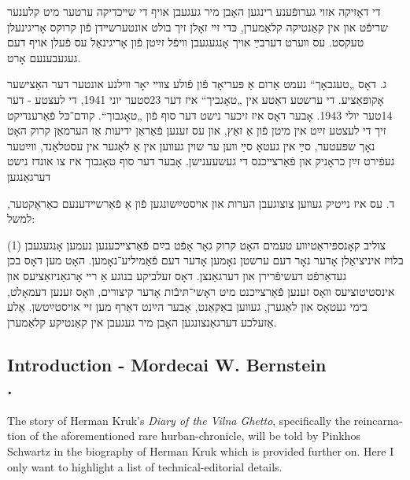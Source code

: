 \documentclass{article}
\begin{document}
\begin{pairs}
\begin{Rightside}
\begin{RTL}
\begin{hebrew}
די דאָזיקה אזוי גערופֿענע רינגען האָבן מיר געגעבן אויף די שײכדיקה ערטער מיט קלענער
שריפֿט און אין קאַנטיקה קלאַמערן, כּדי זײ זאָלן זיך בולט
אונטערשײדן פֿון קרוקס אָריגינעלן טעקסט. עס װערט דערבײַ אויך אָנגעגעבן
װיפֿל זײַטן פֿון אָריגינאַל עס פֿעלן אויף דעם געגעבענעם אָרט.

ג. דאָס „טעגבאָך“ נעמט אַרום אַ פּעריאָד פֿון פֿולע צװײ יאָר װילנע אונטער
דער האַצישער אָקופּאַציע. די ערשטע דאַטע אין „טאָגביך“ איז דער 23סטער יוני
1941, די לעצטע - דער 14טער יולי 1943. אָבער דאָס איז זיכער נישט דער
סוף פֿון „טאָגבוך“. קודם־כּל פֿאַרענדיקט זיך די לעצטע זײַט אין מיטן פֿון אַ זאַץ,
און עס זענען פֿאַראַן ידיעות אַז הערמאַן קרוק האָט נאָך שפּעטער, סײַ אין
געטאָ סײַ װען ער שוין געװען אין אַ לאַגער אין עסטלאַנד, װײַטער געפֿירט
זײַן כראָניק און פֿאַרצײכנס די געשעענישן. אָבער דער סוף טאָגבוך איז צו
אונדז נישט דערגאַנגען

ד. עס איז נײטיק געװען צוצוגעבן הערות און אויסטײַשונגען פֿון אַ פֿאַרשײדענעם כאַראַקטער, למשל:


 (1) צוליב קאָנספּיראַטיװע טעמים האָט קרוק גאָר אָפֿט בײַם פֿאַרצײכענען
 נעמען אָנגעגעבן בלויז איניציאַלן אָדער נאָר דעם ערשטן נאָמען
 אָדער דעם פֿאַמיליע־נאָמען. האָט מען דאָס בכן געדאַרפֿט דעשיפֿרירן
 און דערגאַנצן. דאָס זעלביקע בנוגע אַ רײ אָרגאַניזאַציעס און אינסטיטוציעס װאָס זענען
 פֿאַרצײכנט מיט ראָשי־תּיבֿות אָדער קיצורים, װאָס
 זענען דעמאָלט, בימי געטאָס און לאַגערן, געװען באַקאַנט, אָבער הײַנט
 דאַרף מען זײ אויסטײַטשן. אַלע אַזעלכע דערגאַנצונגען האָבן מיר געגעבן
 אין קאַנטיקע קלאַמערן.


\endnumbering
\end{hebrew}
\end{RTL}
\end{Rightside}


\begin{Leftside}
\begin{english}
\section{
Introduction - Mordecai W. Bernstein \\  .  }
\beginnumbering
\autopar

The story of Herman Kruk's \emph{Diary of the Vilna Ghetto}, specifically the reincarnation 
of the aforementioned rare hurban-chronicle,
will be told by Pinkhos Schwartz in the biography of Herman Kruk which is provided further on. 
Here I only want to highlight a list of technical-editorial details.


\end{english}
\end{Leftside}
\end{pairs}
\end{document}
